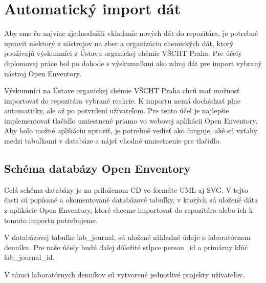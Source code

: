 \documentclass[thesis=M,slovak]{FITthesis}[2013/05/06]
\begin{document}
\section{Automatický import dát}
Aby sme čo najviac zjednodušili vkladanie nových dát do repozitára, je potrebné upraviť niektorý z nástrojov na zber a organizáciu chemických dát, ktorý používajú výskumníci z Ústavu organickej chémie VŠCHT Praha. Pre účely diplomovej práce bol po dohode s výskumníkmi ako zdroj dát pre import vybraný nástroj Open Enventory.

Výskumníci na Ústave organickej chémie VŠCHT Praha chcú mať možnosť importovať do repozitára vybrané reakcie. K importu nemá dochádzať plne automaticky, ale až po potvrdení užívateľom. Pre tento účel je najlepšie implementovať tlačidlo umiestnené priamo vo webovej aplikácii Open Enventory. Aby bolo možné aplikáciu upraviť, je potrebné vedieť ako funguje, aké sú vzťahy medzi tabuľkami v databáze a nájsť vhodné umiestnenie pre tlačidlo.

\subsection{Schéma databázy Open Enventory}
Celá schéma databázy je na priloženom CD vo formáte UML aj SVG. V tejto časti sú popísané a okomentované databázové tabuľky, v ktorých sú uložené dáta z aplikácie Open Enventory, ktoré chceme importovať do repozitára alebo ich k tomuto importu potrebujeme.


V databázovej tabuľke lab\_journal, sú uložené základné údaje o laboratórnom denníku. Pre naše účely budú ďalej dôležité stĺpce person\_id a primárny kľúč lab\_journal\_id.


V rámci laboratórnych denníkov sú vytvorené jednotlivé projekty užívateľov.
\end{document}
